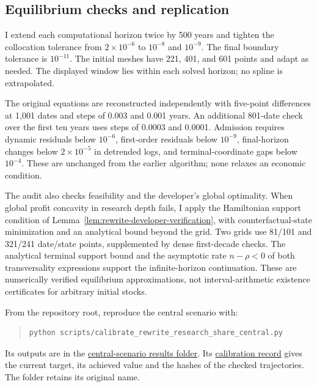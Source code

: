 \subsection{Equilibrium checks and replication}

I extend each computational horizon twice by 500 years and tighten the
collocation tolerance from $2\times10^{-6}$ to $10^{-8}$ and $10^{-9}$.
The final boundary tolerance is $10^{-11}$. The initial meshes have
221, 401, and 601 points and adapt as needed. The displayed window lies
within each solved horizon; no spline is extrapolated.

The original equations are reconstructed independently with five-point
differences at 1,001 dates and steps of 0.003 and 0.001 years. An additional
801-date check over the first ten years uses steps of 0.0003 and 0.0001.
Admission requires dynamic residuals below $10^{-6}$, first-order residuals
below $10^{-9}$, final-horizon changes below $2\times10^{-5}$ in detrended
logs, and terminal-coordinate gaps below $10^{-4}$. These are unchanged
from the earlier algorithm; none relaxes an economic condition.

The audit also checks feasibility and the developer's global optimality.
When global profit concavity in research depth fails, I apply the
Hamiltonian support condition of Lemma~\ref{lem:rewrite-developer-verification},
with counterfactual-state minimization and an analytical bound beyond the
grid. Two grids use 81/101 and 321/241 date/state points, supplemented by
dense first-decade checks. The analytical terminal support bound and the
asymptotic rate $n-\rho<0$ of both transversality expressions support the
infinite-horizon continuation. These are numerically verified equilibrium
approximations, not interval-arithmetic existence certificates for arbitrary
initial stocks.



\ifshowfullpricebenchmark

\fi

From the repository root, reproduce the central scenario with:
\begin{quote}
\scriptsize
\begin{verbatim}
python scripts/calibrate_rewrite_research_share_central.py
\end{verbatim}
\end{quote}
Its outputs are in the
\href{https://github.com/oliverpardo1979/AI-Future-Paper-WTF/tree/main/numerical_rewrite/rsi_activation_half_decline}
{central-scenario results folder}. Its
\href{https://github.com/oliverpardo1979/AI-Future-Paper-WTF/blob/main/numerical_rewrite/rsi_activation_half_decline/research_share_target.json}
{calibration record} gives the current target, its achieved value and
the hashes of the checked trajectories. The folder retains its original name.

